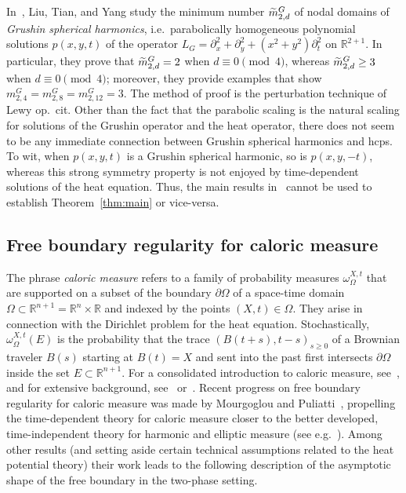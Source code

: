\documentclass[10pt]{amsart}
\theoremstyle{definition}\newtheorem{defi}[theo]{Definition}\newtheorem{rema}[theo]{Remark}\newtheorem{exam}[theo]{Example}\newtheorem{exem}[theo]{Example}\newtheorem{nota}[theo]{Notation}
\newcommand{\R}{\mathbb{R}}
\let\oldtilde\tilde
\renewcommand*{\tilde}[1]{\mathchoice{\widetilde{#1}}{\widetilde{#1}}{\oldtilde{#1}}{\oldtilde{#1}}}
\begin{document}
In~\cite{LTY15}, Liu, Tian, and Yang study the minimum number $\tilde m^G_{2,d}$ of nodal domains of \emph{Grushin spherical harmonics}, i.e.~parabolically homogeneous polynomial solutions $p(x,y,t)$ of the operator $L_G=\partial_x^2 + \partial_y^2 + (x^2 + y^2) \partial_t^2$ on $\R^{2+1}$. In particular, they prove that $\tilde m^G_{2,d}=2$ when $d\equiv 0\pmod{4}$, whereas $\tilde m^G_{2,d}\geq 3$ when $d\equiv 0\pmod{4}$; moreover, they provide examples that show $m^G_{2,4}=m^G_{2,8}=m^G_{2,12}=3$. The method of proof is the perturbation technique of Lewy op.~cit. Other than the fact that the parabolic scaling is the natural scaling for solutions of the Grushin operator and the heat operator, there does not seem to be any immediate connection between Grushin spherical harmonics and hcps. To wit, when $p(x,y,t)$ is a Grushin spherical harmonic, so is $p(x,y,-t)$, whereas this strong symmetry property is not enjoyed by time-dependent solutions of the heat equation. Thus, the main results in~\cite{LTY15} cannot be used to establish Theorem~\ref{thm:main} or vice-versa.


\subsection{Free boundary regularity for caloric measure} \label{ss:2-phase}

The phrase \emph{caloric measure} refers to a family of probability measures $\omega^{X,t}_\Omega$ that are supported on a subset of the boundary $\partial\Omega$ of a space-time domain $\Omega\subset \R^{n+1}=\R^{n}\times\R$ and indexed by the points $(X,t)\in\Omega$. They arise in connection with the Dirichlet problem for the heat equation. Stochastically, $\omega^{X,t}_\Omega(E)$ is the probability that the trace $(B(t+s),t-s)_{s\geq 0}$ of a Brownian traveler $B(s)$ starting at $B(t)=X$ and sent into the past first intersects $\partial\Omega$ inside the set $E\subset\R^{n+1}$. For a consolidated introduction to caloric measure, see~\cite[Section~3]{dim-caloric}, and for extensive background, see~\cite{Watson} or~\cite{Doob}. Recent progress on free boundary regularity for caloric measure was made by Mourgoglou and Puliatti~\cite{MP21}, propelling the time-dependent theory for caloric measure closer to the better developed, time-independent theory for harmonic and elliptic measure (see e.g.~\cite{AM19,BETnu,KPT}). Among other results (and setting aside certain technical assumptions related to the heat potential theory) their work leads to the following description of the asymptotic shape of the free boundary in the two-phase setting.
\end{document}
